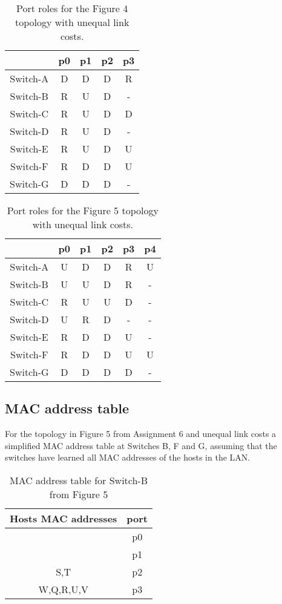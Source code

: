 \documentclass{article}
\begin{document}
\begin{table}[!h]
 \centering
    \begin{tabular}{|c|c|c|c|c|}
    \hline
         & p0 & p1 & p2 & p3  \\
    \hline
    Switch-A & D & D & D & R  \\ 
    Switch-B & R & U & D & - \\
    Switch-C & R & U & D & D  \\
    Switch-D & R & U & D & -  \\
    Switch-E & R & U & D & U  \\
    Switch-F & R & D & D & U  \\
    Switch-G & D & D & D & -  \\
    \hline
    \end{tabular}
    \caption{Port roles for the Figure 4 topology with unequal link costs.}
    \label{tab:fig4neq}
\end{table}


\begin{table}[!h]
      \centering
    \begin{tabular}{|c|c|c|c|c|c|}
    \hline
         & p0 & p1 & p2 & p3 & p4 \\
    \hline
    Switch-A & U & D & D & R & U \\
    Switch-B & U & U & D & R & - \\
    Switch-C & R & U & U & D & - \\
    Switch-D & U & R & D & - & - \\
    Switch-E & R & D & D & U & - \\
    Switch-F & R & D & D & U & U \\
    Switch-G & D & D & D & D & - \\
    \hline
    \end{tabular}
    \caption{Port roles for the Figure 5 topology with unequal link costs.}
    \label{tab:fig5neq}
\end{table}



\subsection{MAC address table}

For the topology in Figure 5 from Assignment 6 and unequal link costs a simplified MAC address table at Switches B, F and G, assuming that the switches have learned all MAC addresses of the hosts in the LAN. 

\begin{table}[!h]
   \centering
    \begin{tabular}{|c|c|}
        \hline
        Hosts MAC addresses & port \\ \hline
                           & p0   \\ 
                           & p1   \\ 
                  S,T         & p2   \\ 
                     W,Q,R,U,V      & p3   \\
        \hline
    \end{tabular}
    \caption{MAC address table for Switch-B from Figure 5}
    \label{tab:bmac}
\end{table}
\end{document}
